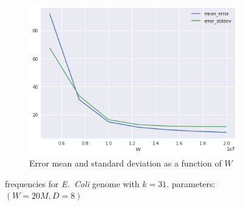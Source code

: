\begin{figure}[htbp]
    \begin{subfigure}{.5\textwidth}
        \centering
        \includegraphics[width=\textwidth]{figures/e_coli-error_mean_stddev-K31-D8-T40}
        \caption{Error mean and standard deviation as a function of $W$}
    \end{subfigure}
	\caption{\kmer frequencies for \emph{E.~Coli} genome with $k=31$. \dBCM parameters: $(W=20M, D=8)$}\label{fig:ecoli-exact-frequencies}
\end{figure}

